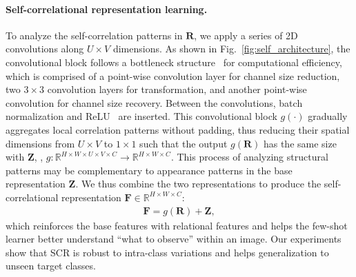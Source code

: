 \documentclass[10pt,twocolumn,letterpaper]{article}
\newcommand{\Real}{\mathbb{R}}
\newcommand{\bF}{\mathbf{F}}
\newcommand{\bZ}{\mathbf{Z}}
\newcommand{\bR}{\mathbf{R}}
\newcommand{\abbself}{SCR\xspace}
\begin{document}
\paragraph{Self-correlational representation learning.}
To analyze the self-correlation patterns in $\bR$, we apply a series of 2D convolutions along $U \times V$ dimensions.
As shown in Fig.~\ref{fig:self_architecture}, 
the convolutional block follows a bottleneck structure~\cite{inceptions} for computational efficiency, which is comprised of a point-wise convolution layer for channel size reduction, two $3\times3$ convolution layers for transformation, and another point-wise convolution for channel size recovery.
Between the convolutions, batch normalization\cite{batchnorm} and ReLU~\cite{relu} are inserted.
This convolutional block $g(\cdot)$ gradually aggregates local correlation patterns without padding, thus reducing their spatial dimensions from $U \times V$ to $1 \times 1$ such that the output $g(\bR)$ has the same size with $\bZ$, \ie, $g: \Real^{H \times W \times U \times V \times C} \rightarrow \Real^{H \times W \times C}$. 
This process of analyzing structural patterns may be complementary to appearance patterns in the base representation $\bZ$. 
We thus combine the two representations to produce the self-correlational representation $\bF \in \mathbb{R}^{H \times W \times C}$:
\begin{eqnarray}
	\bF = g(\bR) + \bZ,  
	\label{eq:ss}
\end{eqnarray}
which reinforces the base features with relational features and helps the few-shot learner better understand ``what to observe'' within an image.
Our experiments show that \abbself is robust to intra-class variations and helps generalization to unseen target classes.
\end{document}
